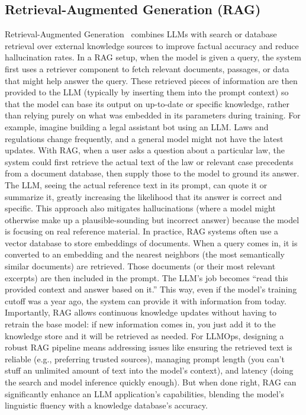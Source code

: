 \subsection{Retrieval-Augmented Generation (RAG)}
Retrieval-Augmented Generation~\cite{Lewis2020RAG} combines LLMs with search or database retrieval over external knowledge sources to improve factual accuracy and reduce hallucination rates. In a RAG setup, when the model is given a query, the system first uses a retriever component to fetch relevant documents, passages, or data that might help answer the query. These retrieved pieces of information are then provided to the LLM (typically by inserting them into the prompt context) so that the model can base its output on up-to-date or specific knowledge, rather than relying purely on what was embedded in its parameters during training. For example, imagine building a legal assistant bot using an LLM. Laws and regulations change frequently, and a general model might not have the latest updates. With RAG, when a user asks a question about a particular law, the system could first retrieve the actual text of the law or relevant case precedents from a document database, then supply those to the model to ground its answer. The LLM, seeing the actual reference text in its prompt, can quote it or summarize it, greatly increasing the likelihood that its answer is correct and specific. This approach also mitigates hallucinations (where a model might otherwise make up a plausible-sounding but incorrect answer) because the model is focusing on real reference material. In practice, RAG systems often use a vector database to store embeddings of documents. When a query comes in, it is converted to an embedding and the nearest neighbors (the most semantically similar documents) are retrieved. Those documents (or their most relevant excerpts) are then included in the prompt. The LLM’s job becomes “read this provided context and answer based on it.” This way, even if the model’s training cutoff was a year ago, the system can provide it with information from today. Importantly, RAG allows continuous knowledge updates without having to retrain the base model: if new information comes in, you just add it to the knowledge store and it will be retrieved as needed. For LLMOps, designing a robust RAG pipeline means addressing issues like ensuring the retrieved text is reliable (e.g., preferring trusted sources), managing prompt length (you can’t stuff an unlimited amount of text into the model’s context), and latency (doing the search and model inference quickly enough). But when done right, RAG can significantly enhance an LLM application’s capabilities, blending the model’s linguistic fluency with a knowledge database’s accuracy.


